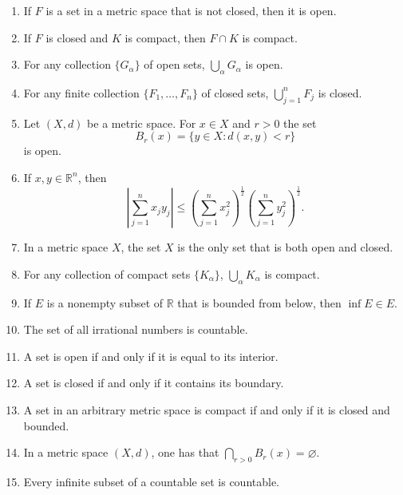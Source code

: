 \documentclass[11pt]{article}
\newcommand{\tfspace}{\vspace{0.5in}}
\begin{document}
\begin{enumerate}
    \item If $F$ is a set in a metric space that is not closed, then it is open.
    \tfspace

    \item If $F$ is closed and $K$ is compact, then $F \cap K$ is compact.
    \tfspace

    \item For any collection $\{G_\alpha\}$ of open sets, $\bigcup_\alpha G_\alpha$ is open.
    \tfspace

    \item For any finite collection $\{F_1, \ldots, F_n\}$ of closed sets, $\bigcup_{j=1}^n F_j$ is closed.
    \tfspace

    \item Let $(X,d)$ be a metric space. For $x \in X$ and $r > 0$ the set
    \[
        B_r(x) = \{ y \in X : d(x,y) < r \}
    \]
    is open.
    \tfspace

    \item If $x, y \in \mathbb{R}^n$, then
    \[
        \left| \sum_{j=1}^n x_j y_j \right| \leq \left( \sum_{j=1}^n x_j^2 \right)^{\frac{1}{2}} \left( \sum_{j=1}^n y_j^2 \right)^{\frac{1}{2}}.
    \]
    \tfspace

    \item In a metric space $X$, the set $X$ is the only set that is both open and closed.
    \tfspace

    \item For any collection of compact sets $\{K_\alpha\}$, $\bigcup_\alpha K_\alpha$ is compact.
    \tfspace

    \item If $E$ is a nonempty subset of $\mathbb{R}$ that is bounded from below, then $\inf E \in E$.
    \tfspace

    \item The set of all irrational numbers is countable.
    \tfspace

    \item A set is open if and only if it is equal to its interior.
    \tfspace

    \item A set is closed if and only if it contains its boundary.
    \tfspace

    \item A set in an arbitrary metric space is compact if and only if it is closed and bounded.
    \tfspace

    \item In a metric space $(X,d)$, one has that $\bigcap_{r > 0} B_r(x) = \varnothing$.
    \tfspace

    \item Every infinite subset of a countable set is countable.
    \tfspace
\end{enumerate}
\end{document}
